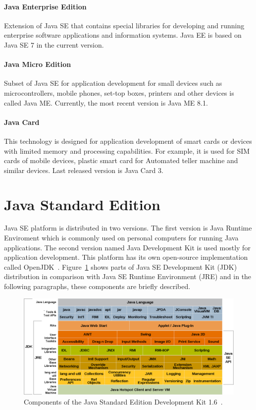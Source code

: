 \paragraph{Java Enterprise Edition}
Extension of Java SE that contains special libraries for developing and running enterprise software applications and
information systems. Java EE is based on Java SE 7 in the current version.

\paragraph{Java Micro Edition}
Subset of Java SE for application development for small devices such as microcontrollers, mobile phones, set-top boxes,
printers and other devices is called Java ME. Currently, the most recent version is Java ME 8.1.

\paragraph{Java Card}
This technology is designed for application development of smart cards or devices with limited memory and processing
capabilities. For example, it is used for SIM cards of mobile devices, plastic smart card for Automated teller machine
and similar devices. Last released version is Java Card 3.

\section{Java Standard Edition}\label{JavaSE}
Java SE platform is distributed in two versions. The first version is Java Runtime Enviroment which is commonly used on
personal computers for running Java applications. The second version named Java Development Kit is used mostly for
application development. This platform has its own open-source implementation called OpenJDK~\cite{OpenJDK}.
Figure~\ref{Java6JDK} shows parts of Java SE Development Kit (JDK) distribution in comparison with Java SE Runtime
Environment (JRE) and in the following paragraphs, these components are briefly described.
\\
\begin{figure}[h!]
    \centering
    \includegraphics[scale=0.35]{fig/java_6_jdk.png}
    \caption{Components of the Java Standard Edition Development Kit 1.6~\cite{Java6Doc}.}
    \label{Java6JDK}
\end{figure}

